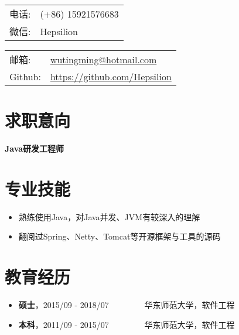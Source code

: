 \documentclass[letterpaper, UTF8, 11pt]{article}
\def\name{\textbf{\textcolor[rgb]{0.00, 0.00, 0.00}{\fontsize{30pt}{30pt}吴庭明}} ~~~~~~~~~ \fontsize{15pt}{15pt}}
\begin{document}
	
	\noindent{\bf \name} 
	\vspace{0.1in}

	\begin{minipage}{0.45\linewidth}
		\begin{tabular}{ll}
			电话:   & (+86) 15921576683 \\
			微信:   & Hepsilion \\
		\end{tabular}
	\end{minipage}
	\begin{minipage}{0.45\linewidth}
		\begin{tabular}{ll}
			邮箱:   & \href{mailto:wutingming@hotmail.com}{ wutingming@hotmail.com} \\
			Github: & \href{https://github.com/Hepsilion}{https://github.com/Hepsilion}\\
		\end{tabular}
	\end{minipage}
	\vspace{-0.1in}
	
	\section*{\textbf{求职意向}}\vspace{-0.12in}
		\textbf{Java研发工程师}
	\vspace{-0.25in}
	
	\section*{\textbf{专业技能}}\vspace{-0.12in}
	\begin{itemize}
		\item 熟练使用Java，对Java并发、JVM有较深入的理解
		\item 翻阅过Spring、Netty、Tomcat等开源框架与工具的源码
	\end{itemize}
	\vspace{-0.32in}
	
	\section*{\textbf{教育经历}}\vspace{-0.12in}
	\begin{itemize}
		\item \textbf{硕士}，2015/09 - 2018/07 ~~~~~~~~华东师范大学，软件工程  ~~~~~~~~~
		\item \textbf{本科}，2011/09 - 2015/07 ~~~~~~~~华东师范大学，软件工程  ~~~~~~~~~
	\end{itemize}
	\vspace{-0.32in}
	
\end{document}
